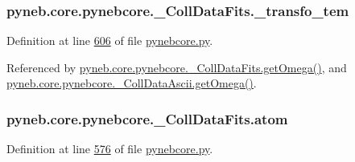 \hypertarget{classpyneb_1_1core_1_1pynebcore_1_1___coll_data_fits_afa9318fd2557709e968682f47cefa379}{
\subsubsection[{\-\_\-transfo\-\_\-tem}]{\setlength{\rightskip}{0pt plus 5cm}pyneb.\-core.\-pynebcore.\-\_\-\-Coll\-Data\-Fits.\-\_\-transfo\-\_\-tem\hspace{0.3cm}{\ttfamily [private]}}}\label{classpyneb_1_1core_1_1pynebcore_1_1___coll_data_fits_afa9318fd2557709e968682f47cefa379}


Definition at line \hyperlink{pynebcore_8py_source_l00606}{606} of file \hyperlink{pynebcore_8py_source}{pynebcore.\-py}.



Referenced by \hyperlink{pynebcore_8py_source_l00828}{pyneb.\-core.\-pynebcore.\-\_\-\-Coll\-Data\-Fits.\-get\-Omega()}, and \hyperlink{pynebcore_8py_source_l01082}{pyneb.\-core.\-pynebcore.\-\_\-\-Coll\-Data\-Ascii.\-get\-Omega()}.

\hypertarget{classpyneb_1_1core_1_1pynebcore_1_1___coll_data_fits_a8bbd2e846954f94878e90ebdf0e51772}{
\subsubsection[{atom}]{\setlength{\rightskip}{0pt plus 5cm}pyneb.\-core.\-pynebcore.\-\_\-\-Coll\-Data\-Fits.\-atom}}\label{classpyneb_1_1core_1_1pynebcore_1_1___coll_data_fits_a8bbd2e846954f94878e90ebdf0e51772}


Definition at line \hyperlink{pynebcore_8py_source_l00576}{576} of file \hyperlink{pynebcore_8py_source}{pynebcore.\-py}.



